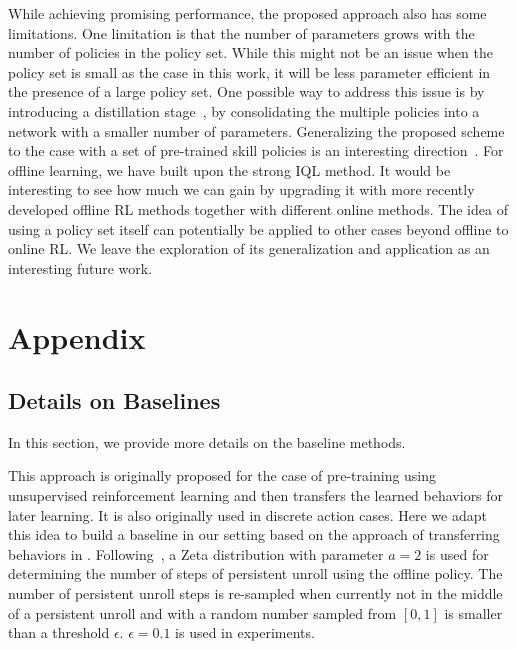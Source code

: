\documentclass{article}
\newcommand{\alg}[1]{\textbf{\texttt{#1}}}
\begin{document}
While achieving promising performance, the proposed approach also has some limitations.
One limitation is that the number of parameters grows with the number of policies in the policy set.
While this might not be an issue when the policy set is small as the case in this work, it will
be less parameter efficient in the presence of a large policy set.
One possible way to address this issue is by introducing a distillation stage~\citep{policy_distillation}, by
consolidating the multiple policies into a network with a smaller number of parameters.
Generalizing the proposed scheme to the case with a set of pre-trained skill policies is an interesting direction~\citep{DIAYN, MTRL}.
For offline learning, we have built upon the strong IQL method.
It would be interesting to see how much  we can gain by upgrading it with more recently developed offline RL methods together with different online methods.
The idea of using a policy set itself can potentially be applied to other cases beyond offline to online RL. We leave the exploration of its generalization and application as an interesting future work.



\newpage






\appendix


\section{Appendix}


\subsection{Details on Baselines}
In this section, we provide more details on the baseline methods.
\vspace{-0.1in}


{\flushleft{\textbf{Behavior Transfer (\alg{BT}).}}}
This approach is originally proposed for the case of pre-training using unsupervised
reinforcement learning and then transfers the learned behaviors for later learning.
It is also originally used in discrete action cases. Here we adapt this idea to build a
baseline in our setting based on the approach of transferring behaviors in \citep{behavior_transfer}.
Following~\citep{behavior_transfer}, a Zeta distribution with parameter $a=2$ is used for determining the number of steps of
persistent unroll using the offline policy.
The number of persistent unroll steps is re-sampled when currently not in the middle of a persistent unroll and with a random number sampled from $[0, 1]$ is smaller than a threshold $\epsilon$. $\epsilon=0.1$ is used in experiments.
\end{document}
